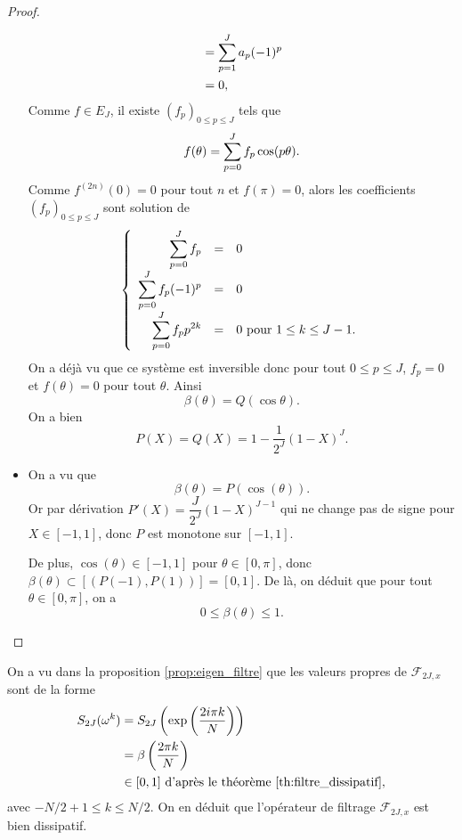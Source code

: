 \begin{proof}
\begin{itemize}
\begin{align*}
	& = \displaystyle\sum\limits_{p=1}^J a_p(-1)^p \\
	& = 0,
\end{align*}
Comme $f \in E_J$, il existe $(f_p)_{0 \leq p \leq J}$ tels que
\begin{equation}
f(\theta) = \displaystyle\sum\limits_{p=0}^J f_p \cos (p \theta).
\end{equation}
Comme $f^{(2n)}(0)=0$ pour tout $n$ et $f(\pi)=0$, alors les coefficients $(f_p)_{0 \leq p \leq J}$ sont solution de 
\begin{equation}
\left\lbrace
\begin{array}{rcl}
\displaystyle\sum\limits_{p=0}^J f_p & = & 0 \\
\displaystyle\sum\limits_{p=0}^J f_p (-1)^p & = & 0 \\
\displaystyle\sum\limits_{p=0}^J f_p p^{2k} & = & 0 \text{ pour } 1 \leq k \leq J-1.
\end{array}
\right.
\end{equation}
On a déjà vu que ce système est inversible donc pour tout $0 \leq p \leq J$, $f_p = 0$ et $f(\theta) = 0$ pour tout $\theta$. Ainsi 
\begin{equation}
\beta(\theta) = Q(\cos\theta).
\end{equation}
On a bien
\begin{equation}
P(X) = Q(X) = 1-\dfrac{1}{2^J}(1-X)^J.
\end{equation}

\item On a vu que
\begin{equation}
\beta(\theta) = P(\cos (\theta)).
\end{equation}
Or par dérivation $P'(X) =  \dfrac{J}{2^J}(1-X)^{J-1}$ qui ne change pas de signe pour $X \in [-1,1]$, donc $P$ est monotone sur $[-1,1]$.

De plus, $\cos(\theta) \in [-1,1]$ pour $\theta \in [0, \pi]$, donc $\beta(\theta) \subset [(P(-1), P(1))] = [0,1]$. De là, on déduit que pour tout $\theta \in [0,\pi]$, on a
\begin{equation}
0 \leq \beta(\theta) \leq 1.
\end{equation} 
\end{itemize}
\end{proof}

\begin{remarque}
On a vu dans la proposition \ref{prop:eigen_filtre} que les valeurs propres de $\mathcal{F}_{2J,x}$ sont de la forme
\begin{align*}
S_{2J}(\omega^k) & = S_{2J}\left(\exp \left( \dfrac{2 i \pi k}{N} \right) \right) \\
	& = \beta \left(\dfrac{2 \pi k}{N} \right) \\
	& \in [0,1] \text{ d'après le théorème } \ref{th:filtre_dissipatif},
\end{align*}
avec $-N/2+1 \leq k \leq N/2$. On en déduit que l'opérateur de filtrage $\mathcal{F}_{2J,x}$ est bien dissipatif.
\end{remarque}

